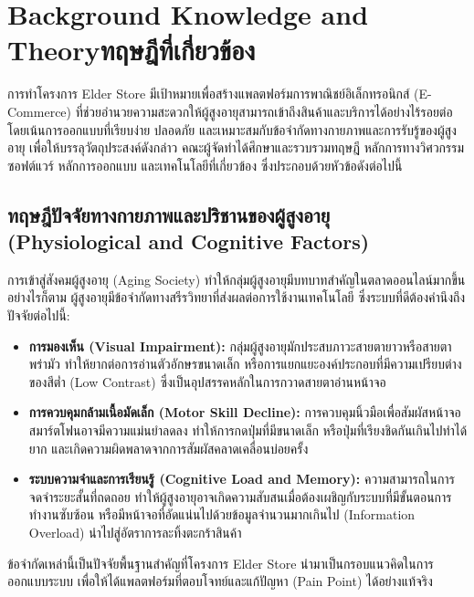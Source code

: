 \chapter{\ifenglish Background Knowledge and Theory\else ทฤษฎีที่เกี่ยวข้อง\fi}

การทำโครงการ Elder Store มีเป้าหมายเพื่อสร้างแพลตฟอร์มการพาณิชย์อิเล็กทรอนิกส์ (E-Commerce) ที่ช่วยอำนวยความสะดวกให้ผู้สูงอายุสามารถเข้าถึงสินค้าและบริการได้อย่างไร้รอยต่อ โดยเน้นการออกแบบที่เรียบง่าย ปลอดภัย และเหมาะสมกับข้อจำกัดทางกายภาพและการรับรู้ของผู้สูงอายุ เพื่อให้บรรลุวัตถุประสงค์ดังกล่าว คณะผู้จัดทำได้ศึกษาและรวบรวมทฤษฎี หลักการทางวิศวกรรมซอฟต์แวร์ \cite{pressman2014} หลักการออกแบบ และเทคโนโลยีที่เกี่ยวข้อง ซึ่งประกอบด้วยหัวข้อดังต่อไปนี้

\section{ทฤษฎีปัจจัยทางกายภาพและปริชานของผู้สูงอายุ (Physiological and Cognitive Factors)}
การเข้าสู่สังคมผู้สูงอายุ (Aging Society) ทำให้กลุ่มผู้สูงอายุมีบทบาทสำคัญในตลาดออนไลน์มากขึ้น อย่างไรก็ตาม ผู้สูงอายุมีข้อจำกัดทางสรีรวิทยาที่ส่งผลต่อการใช้งานเทคโนโลยี \cite{accessibility_elderly_2012} ซึ่งระบบที่ดีต้องคำนึงถึงปัจจัยต่อไปนี้:
\begin{itemize}
    \item \textbf{การมองเห็น (Visual Impairment):} กลุ่มผู้สูงอายุมักประสบภาวะสายตายาวหรือสายตาพร่ามัว ทำให้ยากต่อการอ่านตัวอักษรขนาดเล็ก หรือการแยกแยะองค์ประกอบที่มีความเปรียบต่างของสีต่ำ (Low Contrast) ซึ่งเป็นอุปสรรคหลักในการกวาดสายตาอ่านหน้าจอ \cite{wai_older_users}
    \item \textbf{การควบคุมกล้ามเนื้อมัดเล็ก (Motor Skill Decline):} การควบคุมนิ้วมือเพื่อสัมผัสหน้าจอสมาร์ตโฟนอาจมีความแม่นยำลดลง ทำให้การกดปุ่มที่มีขนาดเล็ก หรือปุ่มที่เรียงชิดกันเกินไปทำได้ยาก และเกิดความผิดพลาดจากการสัมผัสคลาดเคลื่อนบ่อยครั้ง
    \item \textbf{ระบบความจำและการเรียนรู้ (Cognitive Load and Memory):} ความสามารถในการจดจำระยะสั้นที่ถดถอย ทำให้ผู้สูงอายุอาจเกิดความสับสนเมื่อต้องเผชิญกับระบบที่มีขั้นตอนการทำงานซับซ้อน หรือมีหน้าจอที่อัดแน่นไปด้วยข้อมูลจำนวนมากเกินไป (Information Overload) นำไปสู่อัตราการละทิ้งตะกร้าสินค้า
\end{itemize}
ข้อจำกัดเหล่านี้เป็นปัจจัยพื้นฐานสำคัญที่โครงการ Elder Store นำมาเป็นกรอบแนวคิดในการออกแบบระบบ เพื่อให้ได้แพลตฟอร์มที่ตอบโจทย์และแก้ปัญหา (Pain Point) ได้อย่างแท้จริง

